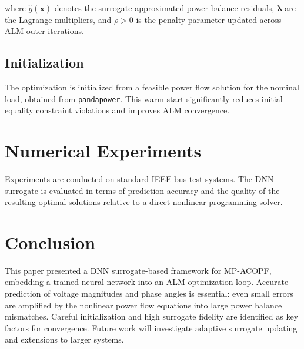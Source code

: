 \documentclass[journal]{IEEEtran}
\begin{document}
where $\hat{g}(\mathbf{x})$ denotes the surrogate-approximated power balance
residuals, $\bm{\lambda}$ are the Lagrange multipliers, and $\rho > 0$ is the
penalty parameter updated across ALM outer iterations.

\subsection{Initialization}

The optimization is initialized from a feasible power flow solution for the nominal
load, obtained from \texttt{pandapower}. This warm-start significantly reduces
initial equality constraint violations and improves ALM convergence.

\section{Numerical Experiments}
\label{sec:experiments}

Experiments are conducted on standard IEEE bus test systems. The DNN surrogate
is evaluated in terms of prediction accuracy and the quality of the resulting
optimal solutions relative to a direct nonlinear programming solver.

\section{Conclusion}
\label{sec:conclusion}

This paper presented a DNN surrogate-based framework for MP-ACOPF, embedding a
trained neural network into an ALM optimization loop. Accurate prediction of
voltage magnitudes and phase angles is essential: even small errors are amplified
by the nonlinear power flow equations into large power balance mismatches. Careful
initialization and high surrogate fidelity are identified as key factors for
convergence. Future work will investigate adaptive surrogate updating and
extensions to larger systems.



\end{document}
